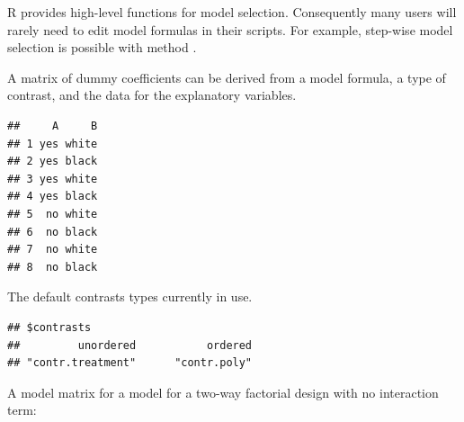 \documentclass[krantz2]{krantz}\usepackage{knitr}
\begin{document}
\begin{explainbox}
R provides high-level functions for model selection. Consequently many \Rlang users will rarely need to edit model formulas in their scripts. For example, step-wise model selection is possible with \Rlang method .

A matrix of dummy coefficients can be derived from a model formula, a type of contrast, and the data for the explanatory variables.

\begin{knitrout}\footnotesize
{}\color{fgcolor}\begin{kframe}
\begin{alltt}
 \hlkwb{<-} \hlstd{(} \hlstd{=} \hlstd{(}\hlstd{(}\hlstd{,} \hlstd{),} \hlstd{(}\hlstd{,} \hlstd{)),}
                         \hlstd{=} \hlstd{(}\hlstd{(}\hlstd{,} \hlstd{),} \hlstd{))}
\end{alltt}
\begin{verbatim}
##     A     B
## 1 yes white
## 2 yes black
## 3 yes white
## 4 yes black
## 5  no white
## 6  no black
## 7  no white
## 8  no black
\end{verbatim}
\end{kframe}
\end{knitrout}

The default contrasts types currently in use.

\begin{knitrout}\footnotesize
{}\color{fgcolor}\begin{kframe}
\begin{alltt}
\hlstd{(}\hlstd{)}
\end{alltt}
\begin{verbatim}
## $contrasts
##         unordered           ordered
## "contr.treatment"      "contr.poly"
\end{verbatim}
\end{kframe}
\end{knitrout}

A model matrix for a model for a two-way factorial design with no interaction term:


\end{explainbox}
\end{document}
